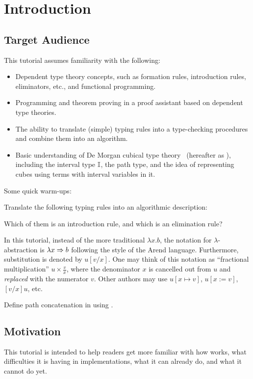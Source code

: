\section{Introduction}
\subsection{Target Audience}
This tutorial assumes familiarity with the following:
\begin{itemize}
\item Dependent type theory concepts, such as formation rules,
introduction rules, eliminators, etc., and functional programming.
\item Programming and theorem proving in a proof assistant based on dependent type theories.
\item The ability to translate (simple) typing rules into a type-checking procedures
and combine them into an algorithm.
\item Basic understanding of De Morgan cubical type theory~\cite{CCHM,CHM}
(hereafter as \CTT{}), including the interval type $\mathbb{I}$, the path type,
and the idea of representing cubes using terms with interval variables in it.
\end{itemize}
Some quick warm-ups:
\begin{exercise}
Translate the following typing rules into an algorithmic description:
Which of them is an introduction rule, and which is an elimination rule?
\end{exercise}
\begin{notation}
In this tutorial, instead of the more traditional $\lambda x.b$, the notation for $\lambda$-abstraction is $\lambda x\Rightarrow b$ 
following the style of the Arend language. Furthermore, substitution is denoted by
$u[v/x]$. One may think of this notation as ``fractional multiplication'' $u\times \frac v x$,
where the denominator $x$ is cancelled out from $u$ and \textit{replaced} with the numerator $v$.
Other authors may use $u[x\mapsto v]$, $u[x:=v]$, $[v/x]u$, etc.
\end{notation}
\begin{exercise}
Define path concatenation in \CTT{} using \hcomp{}.
\end{exercise}
\subsection{Motivation}
This tutorial is intended to help readers get more familiar with how
\CTT{} works, what difficulties it is having in implementations,
what it can already do, and what it cannot do yet.

